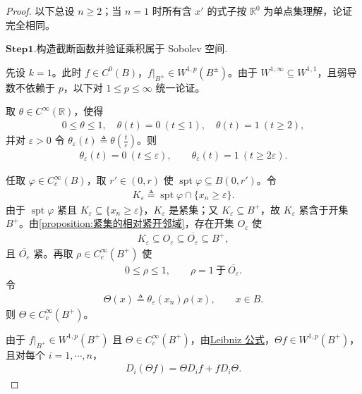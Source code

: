 \documentclass[../../main.tex]{subfiles}
\begin{document}
\begin{proof}

以下总设 $n\geqslant2$；当 $n=1$ 时所有含 $x'$ 的式子按 $\mathbb{R}^{0}$ 为单点集理解，论证完全相同。
    
\noindent$\mathbf{Step}\bm{1}$.{\heiti 构造截断函数并验证乘积属于 Sobolev 空间.}

先设 $k=1$。此时 $f\in C^{0}(B)$，$f|_{B^{\pm}}\in W^{1,p}(B^{\pm})$。由于 $W^{1,\infty}\subseteq W^{1,1}$，且弱导数不依赖于 $p$，以下对 $1\leqslant p\leqslant\infty$ 统一论证。

取 $\theta\in C^{\infty}(\mathbb{R})$，使得
\begin{align*}
0\leqslant\theta\leqslant1,\quad
\theta(t)=0\ (t\leqslant1),\quad
\theta(t)=1\ (t\geqslant2),
\end{align*}
并对 $\varepsilon>0$ 令 $\theta_{\varepsilon}(t)\triangleq\theta\left(\frac{t}{\varepsilon}\right)$。则
\begin{align}
\theta_{\varepsilon}(t)=0\ (t\leqslant\varepsilon),\qquad
\theta_{\varepsilon}(t)=1\ (t\geqslant2\varepsilon).
\label{eq:ch05-theta性质}
\end{align}

任取 $\varphi\in C_{c}^{\infty}(B)$，取 $r'\in(0,r)$ 使 $\operatorname{spt}\varphi\subseteq B(0,r')$。令
\begin{align*}
K_{\varepsilon}\triangleq\operatorname{spt}\varphi\cap\{x_n\geqslant\varepsilon\}.
\end{align*}
由于 $\operatorname{spt}\varphi$ 紧且 $K_{\varepsilon}\subseteq\{x_n\geqslant\varepsilon\}$，$K_{\varepsilon}$ 是紧集；又 $K_{\varepsilon}\subseteq B^{+}$，故 $K_{\varepsilon}$ 紧含于开集 $B^{+}$。由\cref{proposition:紧集的相对紧开邻域}，存在开集 $O_{\varepsilon}$ 使
\begin{align*}
K_{\varepsilon}\subseteq O_{\varepsilon}\subseteq\overline{O_{\varepsilon}}\subseteq B^{+},
\end{align*}
且 $\overline{O_{\varepsilon}}$ 紧。再取 $\rho\in C_{c}^{\infty}(B^{+})$ 使
\begin{align}
0\leqslant\rho\leqslant1,\qquad \rho=1\ \text{于}\ \overline{O_{\varepsilon}}.
\label{eq:ch05-rho性质}
\end{align}
令
\begin{align}
\Theta(x)\triangleq\theta_{\varepsilon}(x_n)\rho(x),\qquad x\in B.
\label{eq:ch05-Theta定义}
\end{align}
则 $\Theta\in C_{c}^{\infty}(B^{+})$。

由于 $f|_{B^{+}}\in W^{1,p}(B^{+})$ 且 $\Theta\in C_{c}^{\infty}(B^{+})$，由\hyperref[theorem:ch05-弱导数性质-4]{Leibniz 公式}，$\Theta f\in W^{1,p}(B^{+})$，且对每个 $i=1,\cdots,n$，
\begin{align}
D_i(\Theta f)=\Theta D_if+fD_i\Theta.
\label{eq:ch05-片状乘积导数}
\end{align}


\end{proof}
\end{document}
